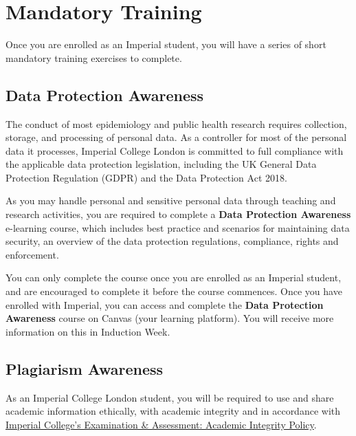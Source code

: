 \documentclass[
]{book}
\begin{document}
\chapter{Mandatory Training}\label{mandatory-training}

Once you are enrolled as an Imperial student, you will have a series of short mandatory training exercises to complete.

\section{Data Protection Awareness}\label{data-protection-awareness}

The conduct of most epidemiology and public health research requires collection, storage, and processing of personal data. As a controller for most of the personal data it processes, Imperial College London is committed to full compliance with the applicable data protection legislation, including the UK General Data Protection Regulation (GDPR) and the Data Protection Act 2018.

As you may handle personal and sensitive personal data through teaching and research activities, you are required to complete a \textbf{Data Protection Awareness} e-learning course, which includes best practice and scenarios for maintaining data security, an overview of the data protection regulations, compliance, rights and enforcement.

You can only complete the course once you are enrolled as an Imperial student, and are encouraged to complete it before the course commences. Once you have enrolled with Imperial, you can access and complete the \textbf{Data Protection Awareness} course on Canvas (your learning platform). You will receive more information on this in Induction Week.

\section{Plagiarism Awareness}\label{plagiarism-awareness}

As an Imperial College London student, you will be required to use and share academic information ethically, with academic integrity and in accordance with \href{https://www.imperial.ac.uk/media/imperial-college/administration-and-support-services/registry/academic-governance/public/academic-policy/academic-integrity/Examination-and-assessments---academic-integrity.pdf}{Imperial College's Examination \& Assessment: Academic Integrity Policy}.
\end{document}
